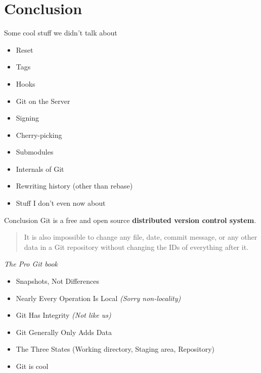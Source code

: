 \documentclass[10pt,aspectratio=169]{beamer}
\begin{document}
\section{Conclusion}

\begin{frame}[fragile]{Some cool stuff we didn't talk about}
    \begin{multicols}{2}
        \begin{itemize}
            \item Reset
            \item Tags
            \item Hooks
            \item Git on the Server
            \item Signing
            \item Cherry-picking
            \item Submodules
            \item Internals of Git
            \item Rewriting history (other than rebase)
            \item Stuff I don't even now about
        \end{itemize}
    \end{multicols}
\end{frame}


\begin{frame}[fragile]{Conclusion}
    Git is a free and open source \textbf{distributed version control system}.

    \vspace*{\baselineskip}

    \begin{quote}
        It is also impossible to change any file, date, commit message, or any other data in a Git repository without changing the IDs of everything after it.
    \end{quote}
    \begin{flushright}
        \textit{The Pro Git book}
    \end{flushright}

    \begin{multicols}{2}
        \begin{itemize}
            \item Snapshots, Not Differences \checkmark
            \item Nearly Every Operation Is Local \textit{(Sorry non-locality)} \checkmark
            \item Git Has Integrity \textit{(Not like us)} \checkmark
            \item Git Generally Only Adds Data \checkmark
            \item The Three States (Working directory, Staging area, Repository) \checkmark
            \item Git is cool \checkmark
        \end{itemize}
    \end{multicols}
\end{frame}
\end{document}
